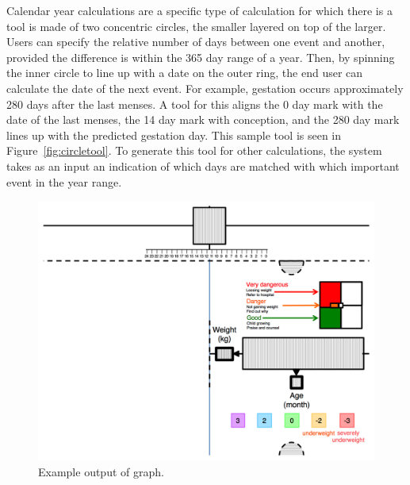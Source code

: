\documentclass{sig-alternate}
\begin{document}
Calendar year calculations are a specific type of calculation for which there is a tool is made of two concentric circles, the smaller layered on top of the larger. Users can specify the relative number of days between one event and another, provided the difference is within the 365 day range of a year. Then, by spinning the inner circle to line up with a date on the outer ring, the end user can calculate the date of the next event. For example, gestation occurs approximately 280 days after the last menses. A tool for this aligns the 0 day mark with the date of the last menses, the 14 day mark with conception, and the 280 day mark lines up with the predicted gestation day. This sample tool is seen in Figure~\ref{fig:circletool}. To generate this tool for other calculations, the \nifty system takes as an input an indication of which days are matched with which important event in the year range.



\begin{figure}
\centering
\includegraphics[width=\linewidth]{img/graph-print.png}
\caption{Example output of graph.}
\label{fig:graph-print}
\end{figure}
\end{document}
